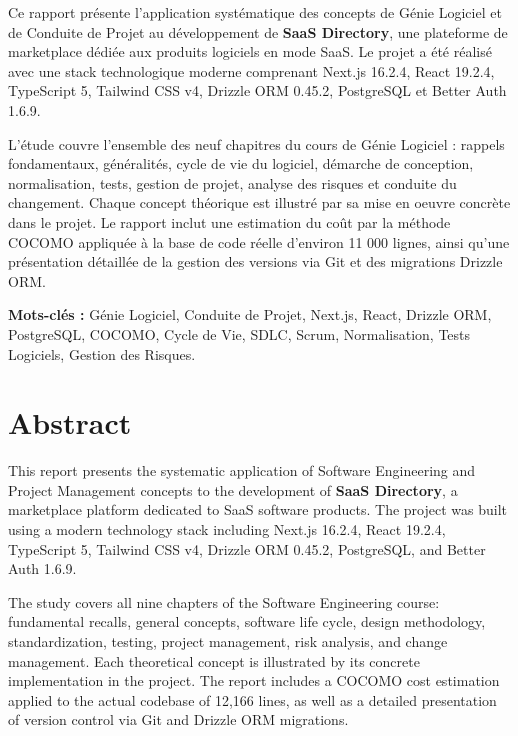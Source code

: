 \documentclass[12pt,a4paper]{article}
\begin{document}
Ce rapport présente l'application systématique des concepts de Génie Logiciel et de Conduite de Projet au développement de \textbf{SaaS Directory}, une plateforme de marketplace dédiée aux produits logiciels en mode SaaS. Le projet a été réalisé avec une stack technologique moderne comprenant Next.js 16.2.4, React 19.2.4, TypeScript 5, Tailwind CSS v4, Drizzle ORM 0.45.2, PostgreSQL et Better Auth 1.6.9.

L'étude couvre l'ensemble des neuf chapitres du cours de Génie Logiciel : rappels fondamentaux, généralités, cycle de vie du logiciel, démarche de conception, normalisation, tests, gestion de projet, analyse des risques et conduite du changement. Chaque concept théorique est illustré par sa mise en oeuvre concrète dans le projet. Le rapport inclut une estimation du coût par la méthode COCOMO appliquée à la base de code réelle d'environ 11 000 lignes, ainsi qu'une présentation détaillée de la gestion des versions via Git et des migrations Drizzle ORM.

\vspace{0.5cm}
\noindent\textbf{Mots-clés :} Génie Logiciel, Conduite de Projet, Next.js, React, Drizzle ORM, PostgreSQL, COCOMO, Cycle de Vie, SDLC, Scrum, Normalisation, Tests Logiciels, Gestion des Risques.
\newpage

\thispagestyle{empty}
\section*{Abstract}

This report presents the systematic application of Software Engineering and Project Management concepts to the development of \textbf{SaaS Directory}, a marketplace platform dedicated to SaaS software products. The project was built using a modern technology stack including Next.js 16.2.4, React 19.2.4, TypeScript 5, Tailwind CSS v4, Drizzle ORM 0.45.2, PostgreSQL, and Better Auth 1.6.9.

The study covers all nine chapters of the Software Engineering course: fundamental recalls, general concepts, software life cycle, design methodology, standardization, testing, project management, risk analysis, and change management. Each theoretical concept is illustrated by its concrete implementation in the project. The report includes a COCOMO cost estimation applied to the actual codebase of 12,166 lines, as well as a detailed presentation of version control via Git and Drizzle ORM migrations.
\end{document}
